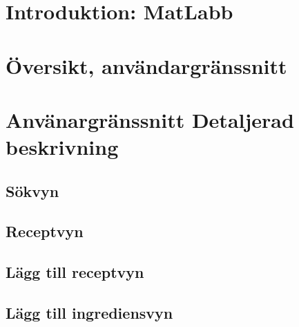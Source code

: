 
\chapter{Introduktion: MatLabb}


\chapter{Översikt, användargränssnitt}


\chapter{Använargränssnitt Detaljerad beskrivning}

  \section{Sökvyn}
  
  \section{Receptvyn}
  
  \section{Lägg till receptvyn}
  
  \section{Lägg till ingrediensvyn}
  
  
